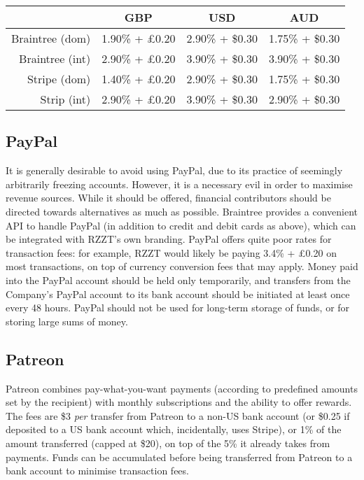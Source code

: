 \documentclass[a4paper,10pt]{article}
\begin{document}
\begin{center}
{\renewcommand{\arraystretch}{1.5}%
\begin{tabular}{r | c | c | c }
                & GBP            & USD             & AUD             \\ \hline
Braintree (dom) & 1.90\% + £0.20 & 2.90\% + \$0.30 & 1.75\% + \$0.30 \\
Braintree (int) & 2.90\% + £0.20 & 3.90\% + \$0.30 & 3.90\% + \$0.30 \\
Stripe (dom)    & 1.40\% + £0.20 & 2.90\% + \$0.30 & 1.75\% + \$0.30 \\
Strip (int)     & 2.90\% + £0.20 & 3.90\% + \$0.30 & 2.90\% + \$0.30
\end{tabular}}
\end{center}

\subsection{PayPal}

It is generally desirable to avoid using PayPal, due to its practice of seemingly arbitrarily freezing accounts. However, it is a necessary evil in order to maximise revenue sources. While it should be offered, financial contributors should be directed towards alternatives as much as possible. Braintree provides a convenient API to handle PayPal (in addition to credit and debit cards as above), which can be integrated with RZZT's own branding. PayPal offers quite poor rates for transaction fees: for example, RZZT would likely be paying 3.4\% + £0.20 on most transactions, on top of currency conversion fees that may apply. Money paid into the PayPal account should be held only temporarily, and transfers from the Company's PayPal account to its bank account should be initiated at least once every 48 hours. PayPal should not be used for long-term storage of funds, or for storing large sums of money.

\subsection{Patreon}

Patreon combines pay-what-you-want payments (according to predefined amounts set by the recipient) with monthly subscriptions and the ability to offer rewards. The fees are \$3 \textit{per} transfer from Patreon to a non-US bank account (or \$0.25 if deposited to a US bank account which, incidentally, uses Stripe), or 1\% of the amount transferred (capped at \$20), on top of the 5\% it already takes from payments. Funds can be accumulated before being transferred from Patreon to a bank account to minimise transaction fees.
\end{document}
